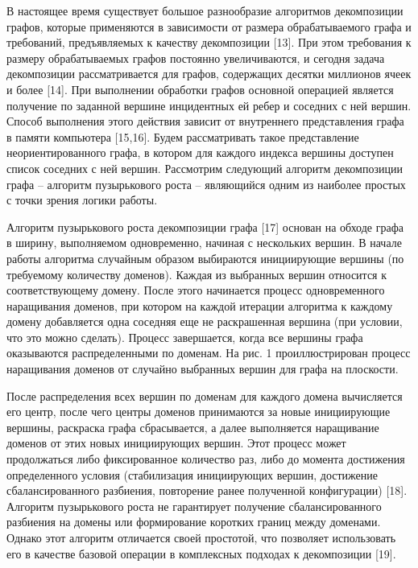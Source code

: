\documentclass[
11pt,%
tightenlines,%
twoside,%
onecolumn,%
nofloats,%
nobibnotes,%
nofootinbib,%
superscriptaddress,%
noshowpacs,%
centertags]%
{revtex4}
\begin{document}
В настоящее время существует большое разнообразие алгоритмов декомпозиции графов, которые применяются в зависимости от размера обрабатываемого графа и требований, предъявляемых к качеству декомпозиции [13].
При этом требования к размеру обрабатываемых графов постоянно увеличиваются, и сегодня задача декомпозиции рассматривается для графов, содержащих десятки миллионов ячеек и более [14].
При выполнении обработки графов основной операцией является получение по заданной вершине инцидентных ей ребер и соседних с ней вершин.
Способ выполнения этого действия зависит от внутреннего представления графа в памяти компьютера [15,16].
Будем рассматривать такое представление неориентированного графа, в котором для каждого индекса вершины доступен список соседних с ней вершин.
Рассмотрим следующий алгоритм декомпозиции графа -- алгоритм пузырькового роста -- являющийся одним из наиболее простых с точки зрения логики работы.

Алгоритм пузырькового роста декомпозиции графа [17] основан на обходе графа в ширину, выполняемом одновременно, начиная с нескольких вершин.
В начале работы алгоритма случайным образом выбираются инициирующие вершины (по требуемому количеству доменов).
Каждая из выбранных вершин относится к соответствующему домену.
После этого начинается процесс одновременного наращивания доменов, при котором на каждой итерации алгоритма к каждому домену добавляется одна соседняя еще не раскрашенная вершина (при условии, что это можно сделать).
Процесс завершается, когда все вершины графа оказываются распределенными по доменам.
На рис. 1 проиллюстрирован процесс наращивания доменов от случайно выбранных вершин для графа на плоскости.

После распределения всех вершин по доменам для каждого домена вычисляется его центр, после чего центры доменов принимаются за новые инициирующие вершины, раскраска графа сбрасывается, а далее выполняется наращивание доменов от этих новых инициирующих вершин.
Этот процесс может продолжаться либо фиксированное количество раз, либо до момента достижения определенного условия (стабилизация инициирующих вершин, достижение сбалансированного разбиения, повторение ранее полученной конфигурации) [18].
Алгоритм пузырькового роста не гарантирует получение сбалансированного разбиения на домены или формирование коротких границ между доменами.
Однако этот алгоритм отличается своей простотой, что позволяет использовать его в качестве базовой операции в комплексных подходах к декомпозиции [19].
\end{document}
